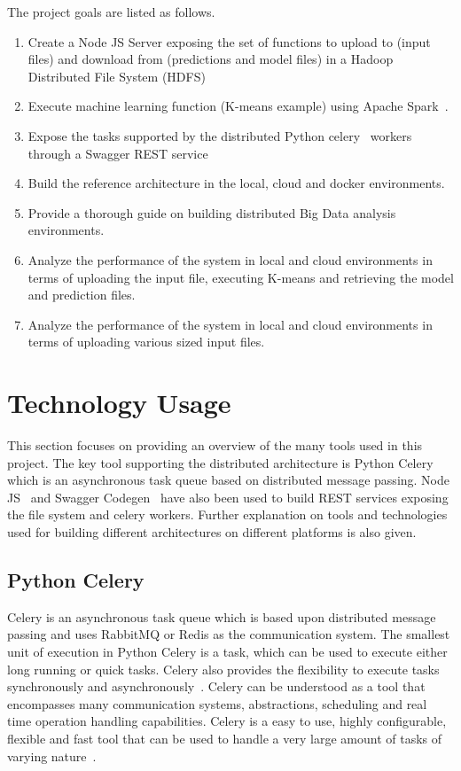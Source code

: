 The project goals are listed as follows.
\begin{enumerate}
	\item Create a Node JS Server exposing the set of functions to upload 
	to (input files) and download from (predictions and model files) in a 
	Hadoop Distributed File System (HDFS)~\cite{hid-sp18-416-www-ibm-hdfs}
	\item Execute machine learning function (K-means example) using Apache 
	Spark~\cite{hid-sp18-416-www-apache-spark}.
	\item Expose the tasks supported by the distributed Python 
	celery~\cite{hid-sp18-416-www-python-celery} workers through a Swagger REST 
	service~\cite{hid-sp18-416-www-swagger}
	\item Build the reference architecture in the local, cloud and docker 
	environments.
	\item Provide a thorough guide on building distributed Big Data analysis 
	environments.	
	\item Analyze the performance of the system in local and cloud environments 
	in terms of uploading the input file, executing K-means and retrieving the 
	model and prediction files.
	\item Analyze the performance of the system in local and cloud environments 
	in terms of uploading various sized input files.
\end{enumerate}

\section{Technology Usage}

This section focuses on providing an overview of the many tools used in this 
project. The key tool supporting the distributed architecture is Python 
Celery~\cite{hid-sp18-416-www-python-celery} which is an asynchronous task 
queue based on distributed message passing. Node 
JS~\cite{hid-sp18-416-www-nodejs} and Swagger 
Codegen~\cite{hid-sp18-416-www-swagger-codegen} have also been used to build 
REST services exposing the file system and celery workers. Further explanation 
on tools and technologies used for building different architectures on 
different platforms is also given.

\subsection{Python Celery}

Celery is an asynchronous task queue which is based upon distributed message 
passing and uses RabbitMQ or Redis as the communication system. The smallest 
unit of execution in Python Celery is a task, which can be used to execute 
either long running or quick tasks. Celery also provides the flexibility to 
execute tasks synchronously and 
asynchronously~\cite{hid-sp18-416-www-python-celery}. Celery 
can be understood as a tool that encompasses many communication systems, 
abstractions, scheduling and real time operation handling capabilities. Celery 
is a easy to use, highly configurable, flexible and fast tool that can be used 
to handle a very large amount of tasks of varying 
nature~\cite{hid-sp18-416-www-vinta-celery-blog}.

